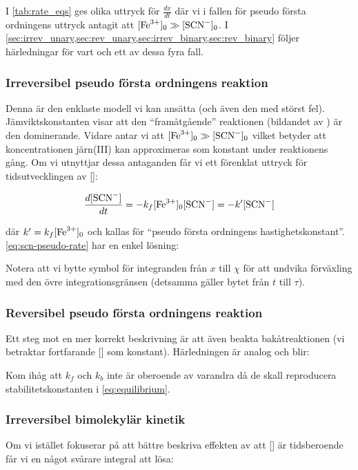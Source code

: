 

I \cref{tab:rate_eqs} ges olika uttryck för $\frac{dx}{dt}$ där vi i
fallen för pseudo första ordningens uttryck antagit att $[\ce{Fe^3+}]_0
\gg [\ce{SCN-}]_0$. I
\cref{sec:irrev_unary,sec:rev_unary,sec:irrev_binary,sec:rev_binary}
följer härledningar för vart och ett av dessa fyra fall.


\subsubsection{Irreversibel pseudo första ordningens reaktion}
\label{sec:irrev_unary}
Denna är den enklaste modell vi kan ansätta (och även den med störst fel).
Jämviktskonstanten visar att den ``framåtgående'' reaktionen (bildandet av )
är den dominerande. Vidare antar vi att $[\ce{Fe^3+}]_0 \gg [\ce{SCN-}]_0$ vilket
betyder att koncentrationen järn(III) kan approximeras som konstant under
reaktionens gång. Om vi utnyttjar dessa antaganden får vi ett förenklat
uttryck för tidsutvecklingen av []:

\begin{equation}
  \label{eq:scn-pseudo-rate}
  \frac{d[\ce{SCN-}]}{dt} = -k_f[\ce{Fe^3+}]_0[\ce{SCN-}] = -k'[\ce{SCN-}]
\end{equation}

där $k' = k_f[\ce{Fe^3+}]_0$ och kallas för ``pseudo första ordningens
hastighetskonstant''. \cref{eq:scn-pseudo-rate} har en enkel lösning:



Notera att vi bytte symbol för integranden från $x$ till $\chi$ för att
undvika förväxling med den övre integrationsgränsen (detsamma gäller
bytet från $t$ till $\tau$).

\subsubsection{Reversibel pseudo första ordningens reaktion}
\label{sec:rev_unary}
Ett steg mot en mer korrekt beskrivning är att även beakta
bakåtreaktionen (vi betraktar fortfarande [] som
konstant). Härledningen är analog och blir:


Kom ihåg att $k_f$ och $k_b$ inte är oberoende av varandra då de skall reproducera
stabilitetskonstanten i \cref{eq:equilibrium}.

\subsubsection{Irreversibel bimolekylär kinetik}
\label{sec:irrev_binary}
Om vi istället fokuserar på att bättre beskriva effekten av att
[] är tidsberoende får vi en något svårare integral att lösa:

